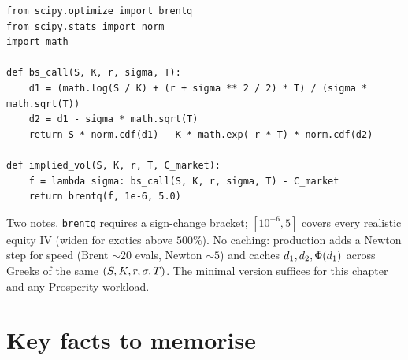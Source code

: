 \begin{lstlisting}[caption={Implied-vol inverter for a European call under Black--Scholes. \texttt{bs\_call} returns the BS price; \texttt{implied\_vol} finds the volatility that reproduces an observed market price via Brent's method. Calling \texttt{implied\_vol(100, 100, 0.05, 1, 10.4506)} returns approximately $0.2000$; calling it on a market price of $11.50$ returns approximately $0.2279$.}]
from scipy.optimize import brentq
from scipy.stats import norm
import math

def bs_call(S, K, r, sigma, T):
    d1 = (math.log(S / K) + (r + sigma ** 2 / 2) * T) / (sigma * math.sqrt(T))
    d2 = d1 - sigma * math.sqrt(T)
    return S * norm.cdf(d1) - K * math.exp(-r * T) * norm.cdf(d2)

def implied_vol(S, K, r, T, C_market):
    f = lambda sigma: bs_call(S, K, r, sigma, T) - C_market
    return brentq(f, 1e-6, 5.0)
\end{lstlisting}

\noindent Two notes. \texttt{brentq} requires a sign-change
bracket; $[10^{-6}, 5]$ covers every realistic equity IV (widen
for exotics above $500\%$). No caching: production adds a Newton
step for speed (Brent $\sim 20$ evals, Newton $\sim 5$) and
caches $d_1, d_2, \Phi(d_1)$ across Greeks of the same
$(S,K,r,\sigma,T)$. The minimal version suffices
for this chapter and any Prosperity workload.

\section{Key facts to memorise}
\label{sec:ch17_key_facts}

